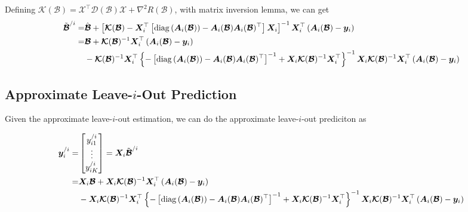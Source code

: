 \documentclass[11pt]{article}
\newcommand{\by}{\bm{y}}
\newcommand{\bX}{\bm{X}}
\begin{document}
Defining $\bm{\mathcal{K}}(\bm{\mathcal{B}})=
\bm{\mathcal{X}}^\top
\bm{\mathcal{D}}(\bm{\mathcal{B}})\bm{\mathcal{X}}+\nabla^2R(\bm{\mathcal{B}})$, with matrix inversion lemma, we can get
$$\begin{aligned}
\tilde{\bm{\mathcal{B}}}^{/i}
=&\hat{\bm{\mathcal{B}}}+\left[\bm{\mathcal{K}}(\bm{\mathcal{B}})-\bX_i^\top\left[{\rm diag}\left(\bm{A}_i(\bm{\mathcal{B}})\right)-\bm{A}_i(\bm{\mathcal{B}})\bm{A}_i(\bm{\mathcal{B}})^\top\right]\bX_i\right]^{-1}\bX_i^\top\left(\bm{A}_i(\bm{\mathcal{B}})-\by_i\right) \\
=&\bm{\mathcal{B}}+\bm{\mathcal{K}}(\bm{\mathcal{B}})^{-1}\bX_i^\top\left(\bm{A}_i(\bm{\mathcal{B}})-\by_i\right) \\
&-
\bm{\mathcal{K}}(\bm{\mathcal{B}})^{-1}\bX_i^\top\left\{-\left[{\rm diag}\left(\bm{A}_i(\bm{\mathcal{B}})\right)-\bm{A}_i(\bm{\mathcal{B}})\bm{A}_i(\bm{\mathcal{B}})^\top\right]^{-1}+\bX_i\bm{\mathcal{K}}(\bm{\mathcal{B}})^{-1}\bX_i^\top\right\}^{-1}\bX_i\bm{\mathcal{K}}(\bm{\mathcal{B}})^{-1}\bX_i^\top\left(\bm{A}_i(\bm{\mathcal{B}})-\by_i\right)
\end{aligned}$$

\subsection{Approximate Leave-$i$-Out Prediction}

Given the approximate leave-$i$-out estimation, we can do the approximate leave-$i$-out prediciton as 

$$\begin{aligned}
\by_{i}^{/i}=&
\begin{bmatrix}
y_{i1}^{/i} \\
\vdots \\
y_{iK}^{/i} \\
\end{bmatrix}=
\bX_i\tilde{\bm{\mathcal{B}}}^{/i} \\
=&\bX_i\bm{\mathcal{B}}+\bX_i\bm{\mathcal{K}}(\bm{\mathcal{B}})^{-1}\bX_i^\top\left(\bm{A}_i(\bm{\mathcal{B}})-\by_i\right)\\
&-\bX_i
\bm{\mathcal{K}}(\bm{\mathcal{B}})^{-1}\bX_i^\top\left\{-\left[{\rm diag}\left(\bm{A}_i(\bm{\mathcal{B}})\right)-\bm{A}_i(\bm{\mathcal{B}})\bm{A}_i(\bm{\mathcal{B}})^\top\right]^{-1}+\bX_i\bm{\mathcal{K}}(\bm{\mathcal{B}})^{-1}\bX_i^\top\right\}^{-1}\bX_i\bm{\mathcal{K}}(\bm{\mathcal{B}})^{-1}\bX_i^\top\left(\bm{A}_i(\bm{\mathcal{B}})-\by_i\right) \\
\end{aligned}$$
\end{document}
